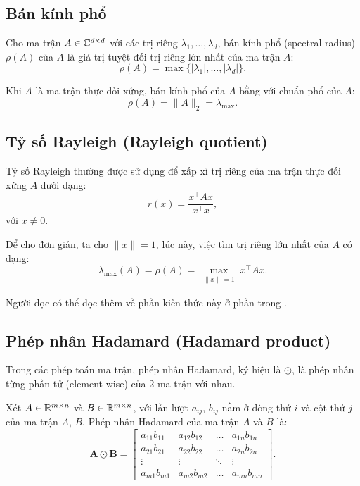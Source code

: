 \subsection{Bán kính phổ}
Cho ma trận $A \in \mathbb C^{d \times d}$ với các trị riêng $\lambda_1, \dots, \lambda_d$, bán kính phổ (spectral radius) $\rho (A)$ của $A$ là giá trị tuyệt đối trị riêng lớn nhất của ma trận $A$:
\[
    \rho (A) = \max\{|\lambda_1|, \dots, |\lambda_d|\}.
\]

Khi $A$ là ma trận thực đối xứng, bán kính phổ của $A$ bằng với chuẩn phổ của $A$:
\[
    \rho (A) = \|A\|_2 = \lambda_{\max}.
\]

\subsection{Tỷ số Rayleigh (Rayleigh quotient)}
Tỷ số Rayleigh thường được sử dụng để xấp xỉ trị riêng của ma trận thực đối xứng $A$ dưới dạng: 
\[
    r(x) = \dfrac{x^{\top} A x}{x^{\top} x},
\]
với $x \neq 0$.

Để cho đơn giản, ta cho $\|x\| = 1$, lúc này, việc tìm trị riêng lớn nhất của $A$ có dạng:
\[
    \lambda_{\max}(A) = \rho(A) =  \max_{\substack{\|x\|=1}} x^{\top} A x.
\]


Người đọc có thể đọc thêm về phần kiến thức này ở phần \MakeUppercase{} trong \cite{trefethennumerical}.






\subsection{Phép nhân Hadamard (Hadamard product)}
Trong các phép toán ma trận, phép nhân Hadamard, ký hiệu là $\odot$, là phép nhân từng phần tử (element-wise) của 2 ma trận với nhau. 

Xét $A \in \mathbb R^{m \times n}$ và $B \in \mathbb R^{m \times n}$, với lần lượt $a_{ij}$, $b_{ij}$ nằm ở dòng thứ $i$ và cột thứ $j$ của ma trận $A$, $B$. Phép nhân Hadamard của ma trận $A$ và $B$ là:
\[
    \mathbf{A} \odot \mathbf{B} =
    \begin{bmatrix}
        a_{11}  b_{11} & a_{12}  b_{12} & \dots  & a_{1n}  b_{1n} \\
        a_{21}  b_{21} & a_{22}  b_{22} & \dots  & a_{2n}  b_{2n} \\
        \vdots & \vdots & \ddots & \vdots \\
        a_{m1}  b_{m1} & a_{m2}  b_{m2} & \dots  & a_{mn}  b_{mn}
    \end{bmatrix}.
\]


